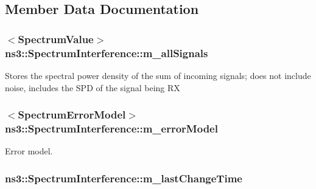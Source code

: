 \subsection{Member Data Documentation}
\subsubsection[{\texorpdfstring{m\+\_\+all\+Signals}{m_allSignals}}]{$<${\bf Spectrum\+Value}$>$ ns3\+::\+Spectrum\+Interference\+::m\+\_\+all\+Signals\hspace{0.3cm}{\ttfamily [private]}}\hypertarget{classns3_1_1SpectrumInterference_a3752d3d120a5f1e8d82a024c25b4717c}{}\label{classns3_1_1SpectrumInterference_a3752d3d120a5f1e8d82a024c25b4717c}
Stores the spectral power density of the sum of incoming signals; does not include noise, includes the S\+PD of the signal being RX 
\subsubsection[{\texorpdfstring{m\+\_\+error\+Model}{m_errorModel}}]{$<${\bf Spectrum\+Error\+Model}$>$ ns3\+::\+Spectrum\+Interference\+::m\+\_\+error\+Model\hspace{0.3cm}{\ttfamily [private]}}\hypertarget{classns3_1_1SpectrumInterference_aa45df49807474e21eeed9613857a3f9f}{}\label{classns3_1_1SpectrumInterference_aa45df49807474e21eeed9613857a3f9f}


Error model. 

\subsubsection[{\texorpdfstring{m\+\_\+last\+Change\+Time}{m_lastChangeTime}}]{ ns3\+::\+Spectrum\+Interference\+::m\+\_\+last\+Change\+Time\hspace{0.3cm}{\ttfamily [private]}}\hypertarget{classns3_1_1SpectrumInterference_a52aa2869af2d44ceb05533ad0c27f83f}{}\label{classns3_1_1SpectrumInterference_a52aa2869af2d44ceb05533ad0c27f83f}


